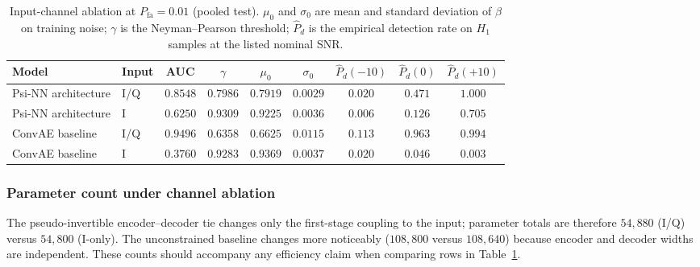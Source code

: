 \begin{table}[!t]
  \centering
  \footnotesize
  \caption{Input-channel ablation at $P_{\mathrm{fa}}\!=\!0.01$ (pooled test). $\mu_0$ and $\sigma_0$ are mean and standard deviation of $\beta$ on training noise; $\gamma$ is the Neyman--Pearson threshold; $\hat{P}_d$ is the empirical detection rate on $H_1$ samples at the listed nominal SNR.}
  \label{tab:channel_ablation}
  \begin{tabular}{@{}llccccccc@{}}
    \toprule
    \textbf{Model} & \textbf{Input} & \textbf{AUC} & \textbf{$\gamma$} & \textbf{$\mu_0$} & \textbf{$\sigma_0$} &
    \textbf{$\hat{P}_d(-10)$} & \textbf{$\hat{P}_d(0)$} & \textbf{$\hat{P}_d(+10)$} \\
    \midrule
    Psi-NN architecture & I/Q & $0.8548$ & $0.7986$ & $0.7919$ & $0.0029$ & $0.020$ & $0.471$ & $1.000$ \\
    Psi-NN architecture & I   & $0.6250$ & $0.9309$ & $0.9225$ & $0.0036$ & $0.006$ & $0.126$ & $0.705$ \\
    ConvAE baseline& I/Q & $0.9496$ & $0.6358$ & $0.6625$ & $0.0115$ & $0.113$ & $0.963$ & $0.994$ \\
    ConvAE baseline& I   & $0.3760$ & $0.9283$ & $0.9369$ & $0.0037$ & $0.020$ & $0.046$ & $0.003$ \\
    \bottomrule
  \end{tabular}
\end{table}

\subsubsection{Parameter count under channel ablation}
The pseudo-invertible encoder--decoder tie changes only the first-stage coupling to the input; parameter totals are therefore $54{,}880$ (I/Q) versus $54{,}800$ (I-only). The unconstrained baseline changes more noticeably ($108{,}800$ versus $108{,}640$) because encoder and decoder widths are independent. These counts should accompany any efficiency claim when comparing rows in Table~\ref{tab:channel_ablation}.

